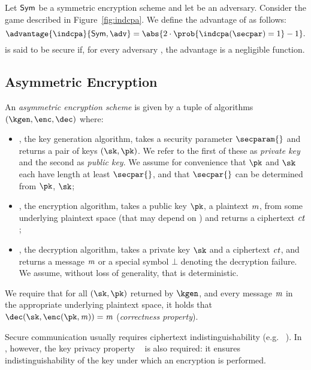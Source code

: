 \begin{definition}[\indcpa]
    Let $\mathsf{Sym}$ be a symmetric encryption scheme and let \adv{} be an adversary. Consider the \indcpa{} game described in Figure~\ref{fig:indcpa}.
    We define the \indcpa{} advantage of \adv{} as follows:
    \[
        \advantage{\indcpa}{\sym, \adv} =  \abs{2\cdot\prob{\indcpa(\secpar) = 1} - 1}.
    \]
    \sym{} is said to be \indcpa{} secure if, for every \ppt{} adversary \adv{}, the advantage \advantage{\indcpa}{\sym, \adv} is a negligible function.
\end{definition}

\subsection{Asymmetric Encryption}\label{preliminaries:definitions:asym-enc}

\begin{definition}
    An \emph{asymmetric encryption scheme} \aSym{} is given by a tuple of \ppt{} algorithms $(\kgen,\enc,\dec)$ where:
    \begin{itemize}
        \item \kgen{}, the key generation algorithm, takes a security parameter $\secparam{}$ and returns a pair of keys $(\sk,\pk)$. We refer to the first of these as \emph{private key} and the second as \emph{public key}. We assume for convenience that $\pk$ and $\sk$ each have length at least $\secpar{}$, and that $\secpar{}$ can be determined from $\pk$, $\sk$;
        \item \enc{}, the encryption algorithm, takes a public key $\pk$, a plaintext $\mathit{m}$, from some underlying plaintext space (that may depend on \pk) and returns a ciphertext $\mathit{ct}$;
        \item \dec{}, the decryption algorithm, takes a private key $\sk$ and a ciphertext $\mathit{ct}$, and returns a message $\mathit{m}$ or a special symbol $\bot$ denoting the decryption failure. We assume, without loss of generality, that \dec{} is deterministic.
    \end{itemize}
    We require that for all $(\sk,\pk)$ returned by $\kgen$, and every message $\mathit{m}$ in the appropriate underlying plaintext space, it holds that $\dec(\sk, \enc(\pk,\msg)) = \msg$ (\emph{correctness property}).
\end{definition}

Secure communication usually requires ciphertext indistinguishability  (e.g. \indccaii{}~\cite[Definition 8]{abdalla1999dhaes}). In \zeth, however, the key privacy property \ikcca{}~\cite{bellare2001key} is also required: it ensures indistinguishability of the key under which an encryption is performed.

